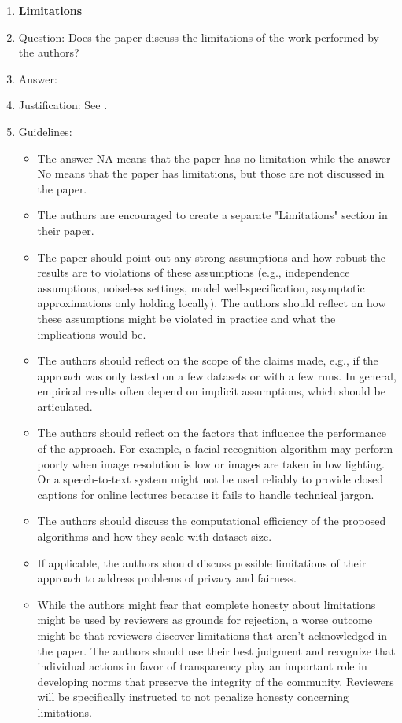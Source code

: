 \begin{enumerate}
\item {\bf Limitations}
\item[] Question: Does the paper discuss the limitations of the work performed by the authors?
\item[] Answer: \answerYes{} %
\item[] Justification: \justificationTODO{} See .
\item[] Guidelines:
  \begin{itemize}
  \item The answer NA means that the paper has no limitation while the answer No means that the paper has limitations, but those are not discussed in the paper.
  \item The authors are encouraged to create a separate "Limitations" section in their paper.
  \item The paper should point out any strong assumptions and how robust the results are to violations of these assumptions (e.g., independence assumptions, noiseless settings, model well-specification, asymptotic approximations only holding locally). The authors should reflect on how these assumptions might be violated in practice and what the implications would be.
  \item The authors should reflect on the scope of the claims made, e.g., if the approach was only tested on a few datasets or with a few runs. In general, empirical results often depend on implicit assumptions, which should be articulated.
  \item The authors should reflect on the factors that influence the performance of the approach. For example, a facial recognition algorithm may perform poorly when image resolution is low or images are taken in low lighting. Or a speech-to-text system might not be used reliably to provide closed captions for online lectures because it fails to handle technical jargon.
  \item The authors should discuss the computational efficiency of the proposed algorithms and how they scale with dataset size.
  \item If applicable, the authors should discuss possible limitations of their approach to address problems of privacy and fairness.
  \item While the authors might fear that complete honesty about limitations might be used by reviewers as grounds for rejection, a worse outcome might be that reviewers discover limitations that aren't acknowledged in the paper. The authors should use their best judgment and recognize that individual actions in favor of transparency play an important role in developing norms that preserve the integrity of the community. Reviewers will be specifically instructed to not penalize honesty concerning limitations.
  \end{itemize}


\end{enumerate}
